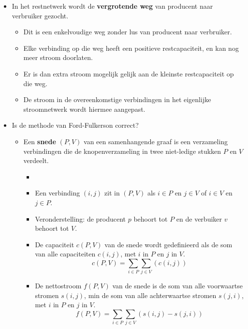 \begin{itemize}
\begin{itemize}
    \end{itemize}
    \item In het restnetwerk wordt de \textbf{vergrotende weg} van producent naar verbruiker gezocht.
    \begin{itemize}
        \item Dit is een enkelvoudige weg zonder lus van producent naar verbruiker.
        \item Elke verbinding op die weg heeft een positieve restcapaciteit, en kan nog meer stroom doorlaten.
        \item Er is dan extra stroom mogelijk gelijk aan de kleinste restcapaciteit op die weg.
        \item De stroom in de overeenkomstige verbindingen in het eigenlijke stroomnetwerk wordt hiermee aangepast.
    \end{itemize}

    \item Is de methode van Ford-Fulkerson correct?
    \begin{itemize}
        \item Een \textbf{snede} $(P, V)$ van een samenhangende graaf is een verzameling verbindingen die de knopenverzameling in twee niet-ledige stukken $P$ en $V$ verdeelt.
        \begin{itemize}
            \item \item Een verbinding $(i, j)$ zit in $(P, V)$ als $i \in P$ en $j \in V$ of $i \in V$ en $j \in P$. 
            \item Veronderstelling: de producent $p$ behoort tot $P$ en de verbuiker $v$ behoort tot $V$.
            \item De capaciteit $c(P, V)$ van de snede wordt gedefinieerd als de som van alle capaciteiten $c(i, j)$, met $i$ in $P$ en $j$ in $V$.
            $$c(P, V) = \sum_{i \in P}\sum_{j \in V} (c(i, j))$$
            \item De nettostroom $f(P, V)$ van de snede is de som van alle voorwaartse stromen $s(i, j)$, min de som van alle achterwaartse stromen $s(j, i)$, met $i$ in $P$ en $j$ in $V$.
            $$f(P, V) = \sum_{i \in P}\sum_{j \in V} (s(i, j) - s(j, i))$$
        \end{itemize}


\end{itemize}
\end{itemize}
